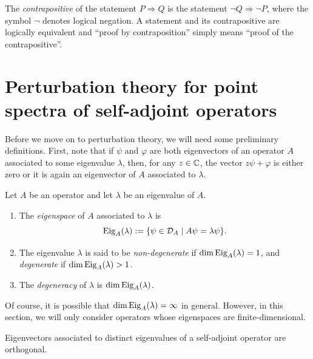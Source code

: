 \begin{remark}
The \emph{contrapositive} of the statement $P\Rightarrow Q$ is the statement $\neg Q\Rightarrow \neg P$, where the symbol $\neg$ denotes logical negation. A statement and its contrapositive are logically equivalent and ``proof by contraposition'' simply means ``proof of the contrapositive''.
\end{remark}

\section{Perturbation theory for point spectra of self-adjoint operators}

Before we move on to perturbation theory, we will need some preliminary definitions. First, note that if $\psi$ and $\varphi$ are both eigenvectors of an operator $A$ associated to some eigenvalue $\lambda$, then, for any $z\in \mathbb{C}$, the vector $z\psi+\varphi$ is either zero or it is again an eigenvector of $A$ associated to $\lambda$. 

\begin{definition}
Let $A$ be an operator and let $\lambda$ be an eigenvalue of $A$.
\begin{enumerate}[label=(\roman*)]
\item The \emph{eigenspace} of $A$ associated to $\lambda$ is
\begin{equation*}
\operatorname{Eig}_A(\lambda) := \{\psi \in \mathcal{D}_A\mid A\psi = \lambda \psi\}.
\end{equation*}
\item The eigenvalue $\lambda$ is said to be \emph{non-degenerate} if $\dim \operatorname{Eig}_A(\lambda)=1$, and \emph{degenerate} if $\dim \operatorname{Eig}_A(\lambda)>1$.  
\item The \emph{degeneracy} of $\lambda$ is $\dim \operatorname{Eig}_A(\lambda)$.
\end{enumerate}
\end{definition}
\begin{remark}
Of course, it is possible that $\dim \operatorname{Eig}_A(\lambda)=\infty$ in general. However, in this section, we will only consider operators whose eigenspaces are finite-dimensional. 
\end{remark}

\begin{lemma}
Eigenvectors associated to distinct eigenvalues of a self-adjoint operator are orthogonal. 
\end{lemma}

